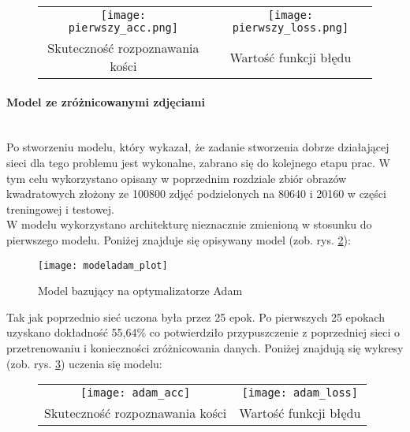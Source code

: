 \begin{figure}[h!]
\begin{center}
\begin{tabular}{cc}
\texttt{[image: pierwszy\_acc.png]} &
\texttt{[image: pierwszy\_loss.png]} \\
 Skuteczność rozpoznawania kości & Wartość funkcji błędu\\
\end{tabular}
\label{fig:first_plots}
\end{center}
\end{figure}

\paragraph{Model ze zróżnicowanymi zdjęciami} \mbox{}\\
Po stworzeniu modelu, który wykazał, że zadanie stworzenia dobrze działającej sieci dla
tego problemu jest wykonalne, zabrano się do kolejnego etapu prac. W tym celu
wykorzystano opisany w poprzednim rozdziale zbiór obrazów kwadratowych złożony ze 100800 zdjęć
podzielonych na 80640 i 20160 w części treningowej i testowej.\\
W modelu wykorzystano architekturę nieznacznie zmienioną w stosunku do pierwszego modelu.
Poniżej znajduje się opisywany model (zob. rys. \ref{fig:adam}): \newpage

\begin{figure}[h!]
\centering
\texttt{[image: modeladam\_plot]}
\caption{Model bazujący na optymalizatorze Adam}
\label{fig:adam}
\end{figure}
Tak jak poprzednio sieć uczona była przez 25 epok.
Po pierwszych 25 epokach uzyskano dokładność 55,64\% co potwierdziło przypuszczenie
z poprzedniej sieci o przetrenowaniu i konieczności zróżnicowania danych.
Poniżej znajdują się wykresy (zob. rys. \ref{fig:adam_plots}) uczenia się modelu:
\newpage
\begin{figure}[h!]
\begin{center}
\begin{tabular}{cc}
\texttt{[image: adam\_acc]} &
\texttt{[image: adam\_loss]} \\
 Skuteczność rozpoznawania kości & Wartość funkcji błędu\\
\end{tabular}
\label{fig:adam_plots}
\end{center}
\end{figure}

